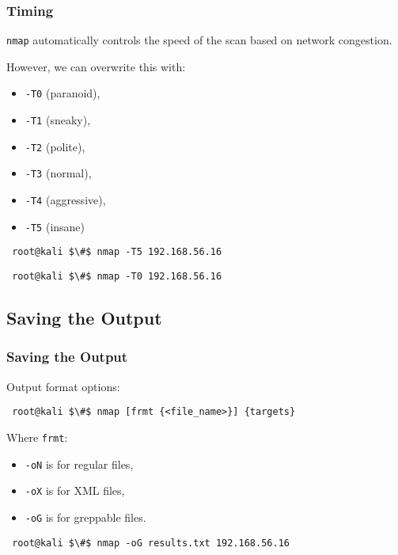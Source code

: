 \documentclass[aspectratio=169,xcolor=dvipsnames]{beamer}
\begin{document}
\begin{frame}[fragile]
    \frametitle{Timing}

    \texttt{nmap} automatically controls the speed of the scan based on network congestion.

    \pause

    \vspace{1em}
  
    However, we can overwrite this with:

    \begin{itemize}
        \item \texttt{-T0} (paranoid), 
        \item \texttt{-T1} (sneaky), 
        \item \texttt{-T2} (polite),
        \item \texttt{-T3} (normal),
        \item \texttt{-T4} (aggressive),
        \item \texttt{-T5} (insane)
    \end{itemize}

    \pause

    \begin{lstlisting}
 root@kali $\#$ nmap -T5 192.168.56.16
    \end{lstlisting}

    \pause

    \begin{lstlisting}
 root@kali $\#$ nmap -T0 192.168.56.16
    \end{lstlisting}

\end{frame}

\subsection{Saving the Output}

\begin{frame}[fragile]
    \frametitle{Saving the Output}

    Output format options:

    \begin{lstlisting}
 root@kali $\#$ nmap [frmt {<file_name>}] {targets}
    \end{lstlisting}

    \pause

    Where \texttt{frmt}:

    \begin{itemize}
        \item \texttt{-oN} is for regular files,
        \item \texttt{-oX} is for XML files,
        \item \texttt{-oG} is for greppable files.
    \end{itemize}

    \pause

    \begin{lstlisting}
 root@kali $\#$ nmap -oG results.txt 192.168.56.16
    \end{lstlisting}
    
\end{frame}
\end{document}

